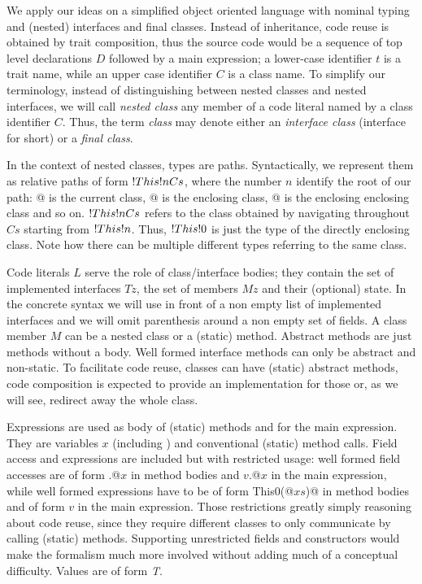 We apply our ideas on a simplified object oriented language with nominal typing and (nested)
interfaces  and final classes.
Instead of inheritance, code reuse is obtained by trait composition, thus the source code would be
a sequence of top level declarations $D$ followed by a main expression;
a lower-case identifier $t$ is a trait name, while an upper case
identifier $C$ is a class name.
To simplify our terminology, instead of distinguishing between 
nested classes and nested interfaces, we will call \emph{nested class} any member of a code literal 
named by a class identifier $C$. Thus, the term \emph{class} may denote either an \emph{interface class} (interface for short) or a \emph{final class}.

In the context of nested classes, types are paths. Syntactically,
we represent them as relative paths of form 
$\This{n}{Cs}$, where the number $n$ identify the root of our path:
@ is the current class, @ is the enclosing class, @ is the enclosing enclosing class and so on. $\This{n}{Cs}$
refers to the class obtained by navigating throughout  $Cs$ starting from $\This{n}$.
Thus, $\This{0}$ is just the type of the directly enclosing class.
Note how there can be multiple different types referring to the same class.

Code literals $L$
serve the role of class/interface bodies; they contain the set of implemented interfaces
$Tz$, the set of members $Mz$ and their (optional) state.
In the concrete syntax we will use \Q@implements@ in front of a non empty list of implemented interfaces
and we will omit parenthesis around a non empty set of fields.
A class member $M$ can be a nested class or a (static) method.
Abstract methods are just methods without a body. 
Well formed interface methods can only be abstract and non-static.
To facilitate code reuse, classes can have (static) abstract methods, code composition is expected to 
provide an implementation for those or, as we will see, redirect away the whole class.

Expressions are used as body of (static) methods and for the main expression.
They are variables $x$ (including \Q@this@)
and conventional (static) method calls.
Field access and \Q@new@ expressions are included but with restricted usage:
well formed field accesses are of form \Q@this.@$x$ in method bodies and
$v$\Q@.@$x$  in the main expression, while 
well formed \Q@new@ expressions have to be of form \Q@new This0(@$xs$\Q@)@ in method bodies
and of form $v$ in the main expression.
Those restrictions greatly simply reasoning about code reuse, since they require different classes to
only communicate by calling (static) methods. Supporting unrestricted fields and constructors would make the formalism much more involved without adding much of a conceptual difficulty.
Values are of form \textit{ T}.

